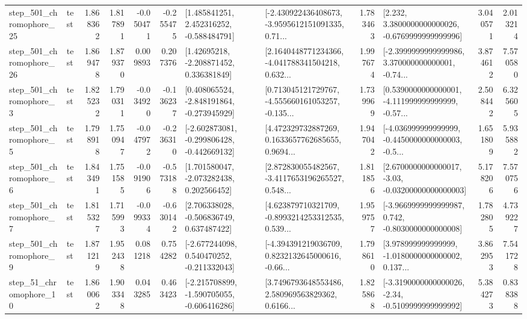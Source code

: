 \begin{tabular}{llrrrrllrlrr}
  step\_501\_chromophore\_25 &      test &      1.868362 &    1.817891 &     -0.050471 & -0.255475 &    [1.485841251, 2.452316252, -0.588484791] &  [-2.430922436408673, -3.9595612151091335, 0.71... &       1.783463 &   [2.232, 3.3800000000000026, -0.6769999999999996] &            3.040571 &          2.013214 \\
  step\_501\_chromophore\_26 &      test &      1.869478 &    1.879370 &      0.009893 &  0.207376 &     [1.42695218, -2.208871452, 0.336381849] &  [2.1640448771234366, -4.041788341504218, 0.632... &       1.997674 &  [-2.3999999999999986, 3.370000000000001, -0.74... &            3.874612 &          7.570580 \\
   step\_501\_chromophore\_3 &      test &      1.825232 &    1.790311 &     -0.034920 & -0.136237 &   [0.408065524, -2.848191864, -0.273945929] &  [0.713045121729767, -4.555660161053257, -0.135... &       1.739969 &  [0.5390000000000001, -4.111999999999999, -0.57... &            2.508442 &          6.325605 \\
   step\_501\_chromophore\_5 &      test &      1.798918 &    1.750947 &     -0.047972 & -0.236310 &  [-2.602873081, -0.299806428, -0.442669132] &  [4.472329732887269, 0.1633657762685655, 0.9694... &       1.947042 &  [-4.036999999999999, -0.4450000000000003, -0.5... &            1.651809 &          5.935882 \\
   step\_501\_chromophore\_6 &      test &      1.843491 &    1.751585 &     -0.091906 & -0.573188 &    [1.701580047, -2.073282438, 0.202566452] &  [2.872830055482567, -3.4117653196265527, 0.548... &       1.811856 &  [2.6700000000000017, -3.03, -0.03200000000000003] &            5.178206 &          7.570756 \\
   step\_501\_chromophore\_7 &      test &      1.815327 &    1.715993 &     -0.099334 & -0.630142 &    [2.706338028, -0.506836749, 0.637487422] &  [4.623879710321709, -0.8993214253312535, 0.539... &       1.959757 &  [-3.9669999999999987, 0.742, -0.8030000000000008] &            1.782805 &          4.739227 \\
   step\_501\_chromophore\_9 &      test &      1.871219 &    1.952438 &      0.081218 &  0.754282 &   [-2.677244098, 0.540470252, -0.211332043] &  [-4.394391219036709, 0.8232132645000616, -0.66... &       1.798610 &  [3.978999999999999, -1.0180000000000002, 0.137... &            3.862953 &          7.541728 \\
   step\_51\_chromophore\_10 &      test &      1.860062 &    1.903348 &      0.043285 &  0.463423 &  [-2.215708899, -1.590705055, -0.606416286] &  [3.7496793648553486, 2.580969563829362, 0.6166... &       1.825868 &  [-3.3190000000000026, -2.34, -0.5109999999999992] &            5.384273 &          0.838388 \\

\end{tabular}
